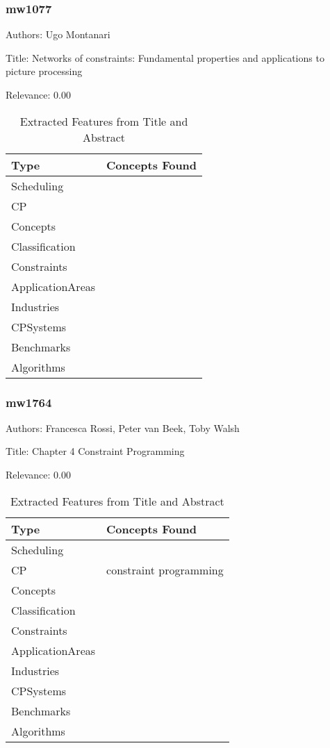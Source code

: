 \subsubsection{mw1077}
\label{mw:mw1077}

Authors: Ugo Montanari

Title: Networks of constraints: Fundamental properties and applications to picture processing

Relevance:  0.00

{\scriptsize
\begin{longtable}{p{2cm}p{20cm}}
\caption{Extracted Features from Title and Abstract}\\ \toprule
Type & Concepts Found\\ \midrule
\endhead
\bottomrule
\endfoot
Scheduling & \\ 
CP & \\ 
Concepts & \\ 
Classification & \\ 
Constraints & \\ 
ApplicationAreas & \\ 
Industries & \\ 
CPSystems & \\ 
Benchmarks & \\ 
Algorithms & \\ 
\end{longtable}
}



\subsubsection{mw1764}
\label{mw:mw1764}

Authors: Francesca Rossi, Peter van Beek, Toby Walsh

Title: Chapter 4 Constraint Programming

Relevance:  0.00

{\scriptsize
\begin{longtable}{p{2cm}p{20cm}}
\caption{Extracted Features from Title and Abstract}\\ \toprule
Type & Concepts Found\\ \midrule
\endhead
\bottomrule
\endfoot
Scheduling & \\ 
CP & constraint programming\\ 
Concepts & \\ 
Classification & \\ 
Constraints & \\ 
ApplicationAreas & \\ 
Industries & \\ 
CPSystems & \\ 
Benchmarks & \\ 
Algorithms & \\ 
\end{longtable}
}



